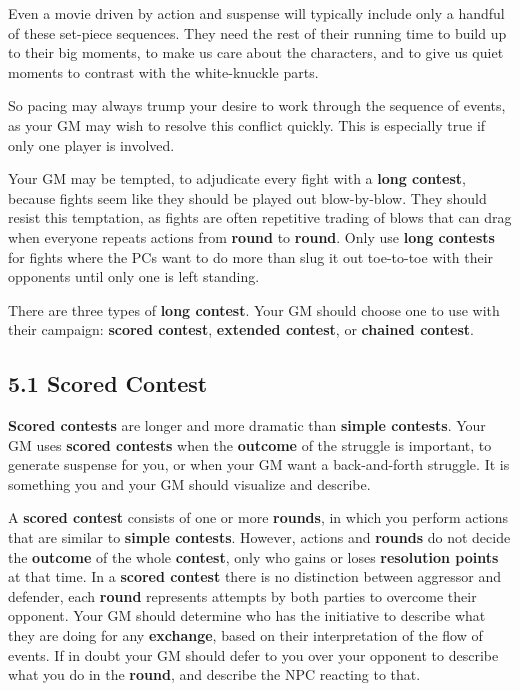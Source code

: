 \documentclass[
]{article}
\begin{document}
Even a movie driven by action and suspense will typically include only a
handful of these set-piece sequences. They need the rest of their
running time to build up to their big moments, to make us care about the
characters, and to give us quiet moments to contrast with the
white-knuckle parts.

So pacing may always trump your desire to work through the sequence of
events, as your GM may wish to resolve this conflict quickly. This is
especially true if only one player is involved.

Your GM may be tempted, to adjudicate every fight with a \textbf{long
contest}, because fights seem like they should be played out
blow-by-blow. They should resist this temptation, as fights are often
repetitive trading of blows that can drag when everyone repeats actions
from \textbf{round} to \textbf{round}. Only use \textbf{long contests}
for fights where the PCs want to do more than slug it out toe-to-toe
with their opponents until only one is left standing.

There are three types of \textbf{long contest}. Your GM should choose
one to use with their campaign: \textbf{scored contest},
\textbf{extended contest}, or \textbf{chained contest}.

\hypertarget{scored-contest}{%
\subsection{5.1 Scored Contest}\label{scored-contest}}

\textbf{Scored contests} are longer and more dramatic than
\textbf{simple contests}. Your GM uses \textbf{scored contests} when the
\textbf{outcome} of the struggle is important, to generate suspense for
you, or when your GM want a back-and-forth struggle. It is something you
and your GM should visualize and describe.

A \textbf{scored contest} consists of one or more \textbf{rounds}, in
which you perform actions that are similar to \textbf{simple contests}.
However, actions and \textbf{rounds} do not decide the \textbf{outcome}
of the whole \textbf{contest}, only who gains or loses
\textbf{resolution points} at that time. In a \textbf{scored contest}
there is no distinction between aggressor and defender, each
\textbf{round} represents attempts by both parties to overcome their
opponent. Your GM should determine who has the initiative to describe
what they are doing for any \textbf{exchange}, based on their
interpretation of the flow of events. If in doubt your GM should defer
to you over your opponent to describe what you do in the \textbf{round},
and describe the NPC reacting to that.
\end{document}
